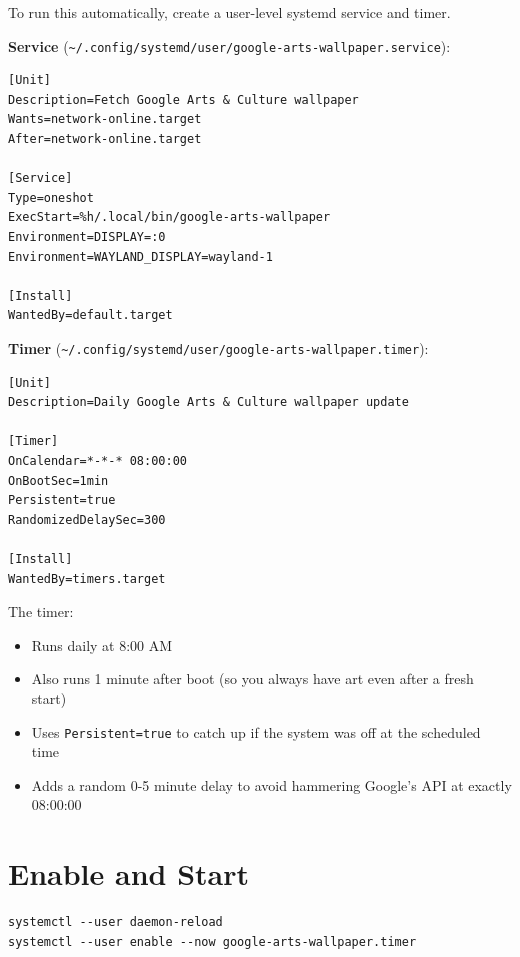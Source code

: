 \documentclass{article}
\begin{document}
To run this automatically, create a user-level systemd service and timer.

\textbf{Service} (\texttt{\textasciitilde{}/.config/systemd/user/google-arts-wallpaper.service}):

\begin{verbatim}
[Unit]
Description=Fetch Google Arts & Culture wallpaper
Wants=network-online.target
After=network-online.target

[Service]
Type=oneshot
ExecStart=%h/.local/bin/google-arts-wallpaper
Environment=DISPLAY=:0
Environment=WAYLAND_DISPLAY=wayland-1

[Install]
WantedBy=default.target
\end{verbatim}

\textbf{Timer} (\texttt{\textasciitilde{}/.config/systemd/user/google-arts-wallpaper.timer}):

\begin{verbatim}
[Unit]
Description=Daily Google Arts & Culture wallpaper update

[Timer]
OnCalendar=*-*-* 08:00:00
OnBootSec=1min
Persistent=true
RandomizedDelaySec=300

[Install]
WantedBy=timers.target
\end{verbatim}

The timer:

\begin{itemize}
\item Runs daily at 8:00 AM

\item Also runs 1 minute after boot (so you always have art even after a fresh start)

\item Uses \texttt{Persistent=true} to catch up if the system was off at the scheduled time

\item Adds a random 0-5 minute delay to avoid hammering Google's API at exactly 08:00:00

\end{itemize}

\section{Enable and Start}

\begin{verbatim}
systemctl --user daemon-reload
systemctl --user enable --now google-arts-wallpaper.timer
\end{verbatim}
\end{document}
